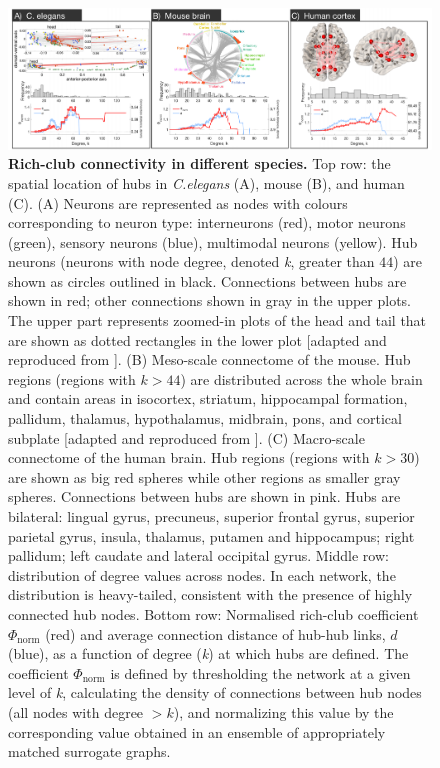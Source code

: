 \begin{figure}[h!]
\begin{center}
\includegraphics[width=1\textwidth]{Chapter3/Ch3Fig2.pdf}%
\end{center}
\caption{\textbf{Rich-club connectivity in different species.} Top row: the spatial location of hubs in \textit{C.elegans} (A), mouse (B), and human (C).
(A) Neurons are represented as nodes with colours corresponding to neuron type: interneurons (red), motor neurons (green), sensory neurons (blue), multimodal neurons (yellow). Hub neurons (neurons with node degree, denoted \textit{k}, greater than $44$) are shown as circles outlined in black. Connections between hubs are shown in red; other connections shown in gray in the upper plots. The upper part represents zoomed-in plots of the head and tail that are shown as dotted rectangles in the lower plot [adapted and reproduced from \citet{Arnatkeviciute2018}].
(B) Meso-scale connectome of the mouse. Hub regions (regions with $k > 44$) are distributed across the whole brain and contain areas in isocortex, striatum, hippocampal formation, pallidum, thalamus, hypothalamus, midbrain, pons, and cortical subplate [adapted and reproduced from \citet{Fulcher2016}].
(C) Macro-scale connectome of the human brain. Hub regions (regions with $k > 30$) are shown as big red spheres while other regions as smaller gray spheres. Connections between hubs are shown in pink. Hubs are bilateral: lingual gyrus, precuneus, superior frontal gyrus, superior parietal gyrus, insula, thalamus, putamen and hippocampus; right pallidum; left caudate and lateral occipital gyrus.
Middle row: distribution of degree values across nodes. In each network, the distribution is heavy-tailed, consistent with the presence of highly connected hub nodes.
Bottom row: Normalised rich-club coefficient $\Phi_\mathrm{norm}$ (red) and average connection distance of hub-hub links, $d$ (blue), as a function of degree (\textit{k}) at which hubs are defined.
The coefficient $\Phi_\mathrm{norm}$ is defined by thresholding the network at a given level of \textit{k}, calculating the density of connections between hub nodes (all nodes with degree $ > k$), and normalizing this value by the corresponding value obtained in an ensemble of appropriately matched surrogate graphs.
}
\end{figure}
